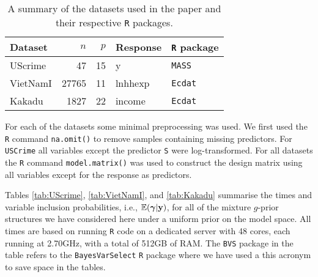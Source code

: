 \begin{table}[h]
	\begin{center}
		\begin{tabular}{l|r|r|l|l}
			Dataset	& $n$ & $p$ & Response & {\tt R} package \\ 
			\hline 
			UScrime 	& 47 & 15 & y & {\tt MASS} \\  
			VietNamI	& 27765 & 11 & lnhhexp & {\tt Ecdat}  \\ 
			Kakadu	& 1827 & 22 & income & {\tt Ecdat}   \\  
		\end{tabular} 
	\end{center}
	\caption{A summary of the datasets used in the paper and their respective {\tt R} packages.}
	\label{tab:datasets}
\end{table}

For each of the datasets some minimal preprocessing was used.
We first used the {\tt R} command {\tt na.omit()} to remove samples containing missing predictors. 
For {\tt USCrime} all variables except the predictor {\tt S} were log-transformed. For all datasets
the {\tt R} command {\tt model.matrix()} was used to construct the design matrix using all 
variables except for the response as predictors.

Tables \ref{tab:UScrime}, \ref{tab:VietNamI}, and \ref{tab:Kakadu} summarise the times and variable 
inclusion probabilities, i.e., ${\mathbb E}({\boldsymbol \gamma}|{\bf y})$, for all of the mixture $g$-prior structures we have considered here under a uniform prior
on the model space.  
All times are based on running {\tt R} code on a dedicated server with 48 cores,
each running at 2.70GHz, with a total of 512GB of RAM.
The {\tt BVS} package in the table refers to the {\tt BayesVarSelect} {\tt R} package where we have used a this acronym to save space in the tables. 




